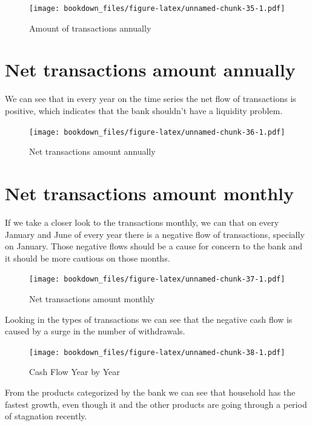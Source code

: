 \documentclass[]{book}
\begin{document}
\begin{figure}
\centering
\texttt{[image: bookdown\_files/figure-latex/unnamed-chunk-35-1.pdf]}
\caption{\label{fig:unnamed-chunk-35}Amount of transactions annually}
\end{figure}

\section{Net transactions amount
annually}\label{net-transactions-amount-annually}

We can see that in every year on the time series the net flow of
transactions is positive, which indicates that the bank shouldn't have a
liquidity problem.

\begin{figure}
\centering
\texttt{[image: bookdown\_files/figure-latex/unnamed-chunk-36-1.pdf]}
\caption{\label{fig:unnamed-chunk-36}Net transactions amount annually}
\end{figure}

\section{Net transactions amount
monthly}\label{net-transactions-amount-monthly}

If we take a closer look to the transactions monthly, we can that on
every January and June of every year there is a negative flow of
transactions, specially on January. Those negative flows should be a
cause for concern to the bank and it should be more cautious on those
months.

\begin{figure}
\centering
\texttt{[image: bookdown\_files/figure-latex/unnamed-chunk-37-1.pdf]}
\caption{\label{fig:unnamed-chunk-37}Net transactions amount monthly}
\end{figure}

Looking in the types of transactions we can see that the negative cash
flow is caused by a surge in the number of withdrawals.

\begin{figure}
\centering
\texttt{[image: bookdown\_files/figure-latex/unnamed-chunk-38-1.pdf]}
\caption{\label{fig:unnamed-chunk-38}Cash Flow Year by Year}
\end{figure}

From the products categorized by the bank we can see that household has
the fastest growth, even though it and the other products are going
through a period of stagnation recently.
\end{document}

